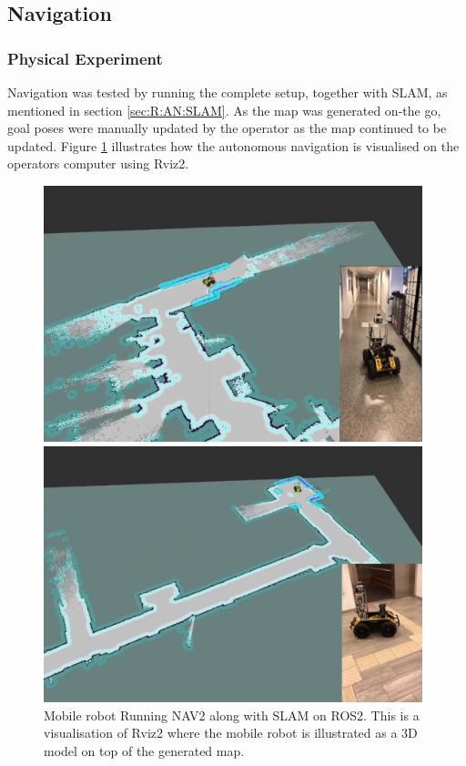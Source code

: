 \subsection{Navigation}\label{sec:R:AN:Navigation}
\subsubsection{Physical Experiment}
Navigation was tested by running the complete setup, together with SLAM, as mentioned in section \ref{sec:R:AN:SLAM}. As the map was generated on-the go, goal poses were manually updated by the operator as the map continued to be updated. Figure \ref{fig:R:H:SLAM:figNavUia} illustrates how the autonomous navigation is visualised on the operators computer using Rviz2.

\begin{figure}[H]
  \centering
  \begin{minipage}[b]{0.49\textwidth}
        \centering
        \includegraphics[width = 0.98\textwidth]{Figures/figNavUia2.png}
  \end{minipage}
  \hfill
  \begin{minipage}[b]{0.49\textwidth}
    \centering
    \includegraphics[width = 0.98\textwidth]{Figures/figNavUia4.png}
  \end{minipage}
  \caption{Mobile robot Running NAV2 along with SLAM on ROS2. This is a visualisation of Rviz2 where the mobile robot is illustrated as a 3D model on top of the generated map.}
  \label{fig:R:H:SLAM:figNavUia}
\end{figure}

